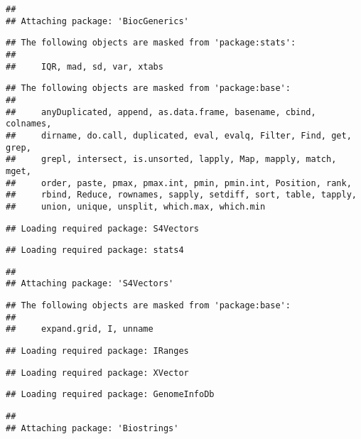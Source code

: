 \documentclass[
]{article}
\begin{document}
\begin{verbatim}
## 
## Attaching package: 'BiocGenerics'
\end{verbatim}

\begin{verbatim}
## The following objects are masked from 'package:stats':
## 
##     IQR, mad, sd, var, xtabs
\end{verbatim}

\begin{verbatim}
## The following objects are masked from 'package:base':
## 
##     anyDuplicated, append, as.data.frame, basename, cbind, colnames,
##     dirname, do.call, duplicated, eval, evalq, Filter, Find, get, grep,
##     grepl, intersect, is.unsorted, lapply, Map, mapply, match, mget,
##     order, paste, pmax, pmax.int, pmin, pmin.int, Position, rank,
##     rbind, Reduce, rownames, sapply, setdiff, sort, table, tapply,
##     union, unique, unsplit, which.max, which.min
\end{verbatim}

\begin{verbatim}
## Loading required package: S4Vectors
\end{verbatim}

\begin{verbatim}
## Loading required package: stats4
\end{verbatim}

\begin{verbatim}
## 
## Attaching package: 'S4Vectors'
\end{verbatim}

\begin{verbatim}
## The following objects are masked from 'package:base':
## 
##     expand.grid, I, unname
\end{verbatim}

\begin{verbatim}
## Loading required package: IRanges
\end{verbatim}

\begin{verbatim}
## Loading required package: XVector
\end{verbatim}

\begin{verbatim}
## Loading required package: GenomeInfoDb
\end{verbatim}

\begin{verbatim}
## 
## Attaching package: 'Biostrings'
\end{verbatim}
\end{document}
